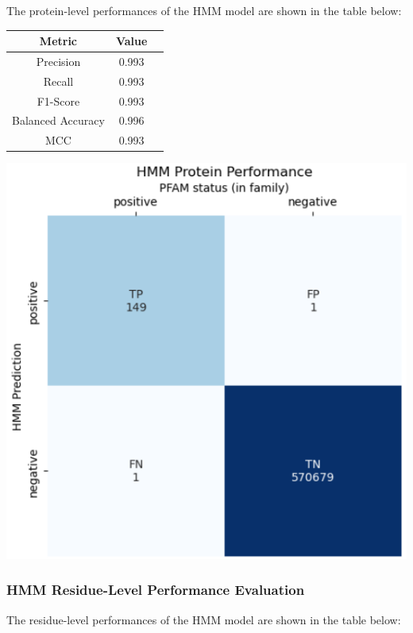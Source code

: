 \documentclass[10pt,twocolumn,letterpaper]{article}
\begin{document}
The protein-level performances of the HMM model are shown in the table below:

\begin{center}
    \begin{tabular}{ccc}
        \toprule
        Metric & Value \\
        \midrule
        Precision & 0.993 \\
        Recall & 0.993 \\
        F1-Score & 0.993 \\
        Balanced Accuracy & 0.996 \\
        MCC & 0.993 \\
        \bottomrule
    \end{tabular}
\end{center} 

\begin{center}
    \includegraphics[scale=0.45]{report/img/hmm_prot_performance.png}
\end{center}

\subsubsection{HMM Residue-Level Performance Evaluation}

The residue-level performances of the HMM model are shown in the table below:
\end{document}
